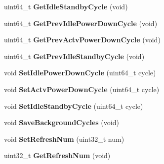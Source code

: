 \begin{DoxyCompactItemize}
\item 
\hypertarget{classMemRankBase_ae9b9b85028133dc860d765b0ad19544f}{uint64\-\_\-t {\bfseries Get\-Idle\-Standby\-Cycle} (void)}\label{classMemRankBase_ae9b9b85028133dc860d765b0ad19544f}

\item 
\hypertarget{classMemRankBase_a329967c85ffade127c3385cc06f49803}{uint64\-\_\-t {\bfseries Get\-Prev\-Idle\-Power\-Down\-Cycle} (void)}\label{classMemRankBase_a329967c85ffade127c3385cc06f49803}

\item 
\hypertarget{classMemRankBase_a1065074c17d3aa40095762f827c79592}{uint64\-\_\-t {\bfseries Get\-Prev\-Actv\-Power\-Down\-Cycle} (void)}\label{classMemRankBase_a1065074c17d3aa40095762f827c79592}

\item 
\hypertarget{classMemRankBase_a5e6065bf843b4448bd36843ca12de7c1}{uint64\-\_\-t {\bfseries Get\-Prev\-Idle\-Standby\-Cycle} (void)}\label{classMemRankBase_a5e6065bf843b4448bd36843ca12de7c1}

\item 
\hypertarget{classMemRankBase_a9bcf1119991fea47e6353a183a055f1b}{void {\bfseries Set\-Idle\-Power\-Down\-Cycle} (uint64\-\_\-t cycle)}\label{classMemRankBase_a9bcf1119991fea47e6353a183a055f1b}

\item 
\hypertarget{classMemRankBase_a9da28403ebdbd8dc07d48da72fcbdbc1}{void {\bfseries Set\-Actv\-Power\-Down\-Cycle} (uint64\-\_\-t cycle)}\label{classMemRankBase_a9da28403ebdbd8dc07d48da72fcbdbc1}

\item 
\hypertarget{classMemRankBase_a18cd5cda2b0a251514e4d9352d500501}{void {\bfseries Set\-Idle\-Standby\-Cycle} (uint64\-\_\-t cycle)}\label{classMemRankBase_a18cd5cda2b0a251514e4d9352d500501}

\item 
\hypertarget{classMemRankBase_ac529c40189c3c3e1afd4cea23967d6c8}{void {\bfseries Save\-Background\-Cycles} (void)}\label{classMemRankBase_ac529c40189c3c3e1afd4cea23967d6c8}

\item 
\hypertarget{classMemRankBase_a2e83901b9c88cf3fd75eab94db30c14b}{void {\bfseries Set\-Refresh\-Num} (uint32\-\_\-t num)}\label{classMemRankBase_a2e83901b9c88cf3fd75eab94db30c14b}

\item 
\hypertarget{classMemRankBase_ae40cd8704dd8b1d50ca359dccdbedbff}{uint32\-\_\-t {\bfseries Get\-Refresh\-Num} (void)}\label{classMemRankBase_ae40cd8704dd8b1d50ca359dccdbedbff}


\end{DoxyCompactItemize}
